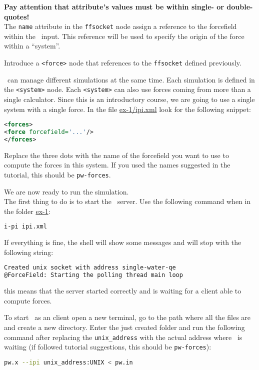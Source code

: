 \documentclass{article}
\begin{document}
\begin{Exercise}[label={i-pi},title={Molecular Dynamics: a client/server approach}]
\textbf{Pay attention that attribute's values must be within single- or
double-quotes!}\\


The \texttt{name} attribute in the \texttt{ffsocket} node assign a
reference to the forcefield within the \ipi\ input. This reference
will be used to specify the origin of the force within a ``system''.

\Question
Introduce a \texttt{<force>} node that references to the
\texttt{ffsocket} defined previously.

\ipi\ can manage different simulations at the same time. Each
simulation is defined in the \texttt{<system>} node. Each
\texttt{<system>} can also use forces coming from more than a single
calculator. Since this is an introductory course, we are going to use
a single system with a single force. In the file \url{ex-1/ipi.xml}
look for the following snippet:
\begin{lstlisting}[language=xml]
<forces>
<force forcefield='...'/>
</forces>
\end{lstlisting}
Replace the three dots with the name of the forcefield you want to use
to compute the forces in this system. If you used the names suggested
in the tutorial, this should be \texttt{pw-forces}.

\Question
We are now ready to run the simulation.\\

The first thing to do is to start the \ipi\ server. Use the following
command when in the folder \url{ex-1}:
\begin{lstlisting}[language=bash]
i-pi ipi.xml
\end{lstlisting}
If everything is fine, the shell will show some messages and will stop
with the following string:
\begin{lstlisting}[language=bash]
Created unix socket with address single-water-qe
@ForceField: Starting the polling thread main loop
\end{lstlisting}
this means that the server started correctly and is waiting for a
client able to compute forces.

To start \pwx\ as an \ipi client open a new terminal, go to the path
where all the files are and create a new directory. Enter the just
created folder and run the
following command after replacing the \texttt{unix\_address} with the
actual address where \ipi\ is waiting (if followed tutorial
suggestions, this should be \texttt{pw-forces}):
\begin{lstlisting}[language=bash]
pw.x --ipi unix_address:UNIX < pw.in 
\end{lstlisting}



\end{Exercise}
\end{document}
